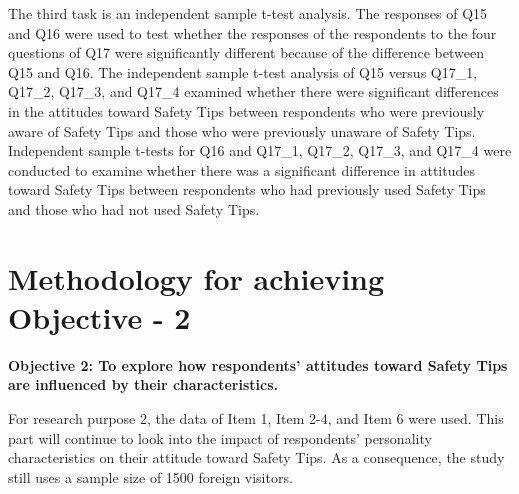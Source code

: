 The third task is an independent sample t-test analysis. The responses of Q15 and Q16 were used to test whether the responses of the respondents to the four questions of Q17 were significantly different because of the difference between Q15 and Q16. The independent sample t-test analysis of Q15 versus Q17\_1, Q17\_2, Q17\_3, and Q17\_4 examined whether there were significant differences in the attitudes toward Safety Tips between respondents who were previously aware of Safety Tips and those who were previously unaware of Safety Tips. Independent sample t-tests for Q16 and Q17\_1, Q17\_2, Q17\_3, and Q17\_4 were conducted to examine whether there was a significant difference in attitudes toward Safety Tips between respondents who had previously used Safety Tips and those who had not used Safety Tips.


\section{Methodology for achieving Objective - 2 }
\textbf{Objective 2: To explore how respondents' attitudes toward Safety Tips are influenced by their characteristics. }

For research purpose 2, the data of Item 1, Item 2-4, and Item 6 were used. This part will continue to look into the impact of respondents' personality characteristics on their attitude toward Safety Tips. As a consequence, the study still uses a sample size of 1500 foreign visitors.

